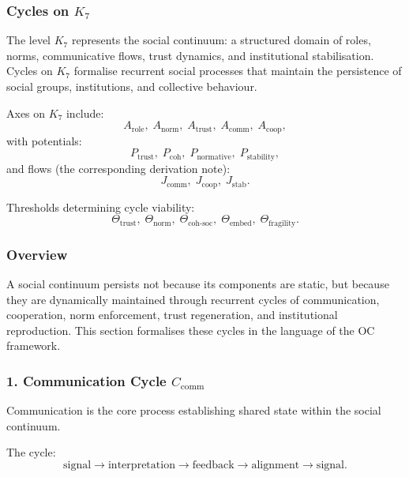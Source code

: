 
\subsubsection{Cycles on \texorpdfstring{$K_7$}{K_7}}
\label{sec:cycles-k7}

The level $K_7$ represents the social continuum: a structured domain of
roles, norms, communicative flows, trust dynamics, and institutional
stabilisation.
Cycles on $K_7$ formalise recurrent social processes that maintain the
persistence of social groups, institutions, and collective behaviour.

Axes on $K_7$ include:
\[
  A_{\mathrm{role}},\;
  A_{\mathrm{norm}},\;
  A_{\mathrm{trust}},\;
  A_{\mathrm{comm}},\;
  A_{\mathrm{coop}},
\]
with potentials:
\[
  P_{\mathrm{trust}},\;
  P_{\mathrm{coh}},\;
  P_{\mathrm{normative}},\;
  P_{\mathrm{stability}},
\]
and flows (the corresponding derivation note):
\[
  J_{\mathrm{comm}},\;
  J_{\mathrm{coop}},\;
  J_{\mathrm{stab}}.
\]

Thresholds determining cycle viability:
\[
  \Theta_{\mathrm{trust}},\;
  \Theta_{\mathrm{norm}},\;
  \Theta_{\mathrm{coh\text{-}soc}},\;
  \Theta_{\mathrm{embed}},\;
  \Theta_{\mathrm{fragility}}.
\]

\subsubsection{Overview}

A social continuum persists not because its components are static, but because
they are dynamically maintained through recurrent cycles of communication,
cooperation, norm enforcement, trust regeneration, and institutional
reproduction.
This section formalises these cycles in the language of the OC framework.

\subsubsection{1. Communication Cycle $C_{\mathrm{comm}}$}

Communication is the core process establishing shared state within the social
continuum.

The cycle:
\[
  \mathrm{signal}
  \to
  \mathrm{interpretation}
  \to
  \mathrm{feedback}
  \to
  \mathrm{alignment}
  \to
  \mathrm{signal}.
\]

